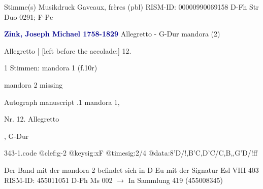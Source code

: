 \documentclass[twocolumn]{book}
\begin{document}
\newline \textcolor{darkblue}{}  Stimme(s)
\newline Musikdruck
\newline Gaveaux, frères  (pbl)
\newline RISM-ID: 00000990069158
\newline D-Fh  Str Duo 0291; F-Pc
\newline \par \vspace{7pt} \textcolor{darkblue}{\textbf{Zink, Joseph Michael  1758-1829}}
\newline Allegretto - G-Dur
\newline mandora (2)
\newline \begin{itshape}[f.10r, at left:] Allegretto | [left before the accolade:] 12.\end{itshape} 
\newline \textcolor{darkblue}{}  1 Stimmen: mandora 1  (f.10r)
\newline \begin{small} mandora 2 missing\end{small} 
\newline Autograph manuscript
.1  mandora 1, \begin{itshape}Nr. 12. Allegretto\end{itshape}, G-Dur  
\begin{filecontents*}{343-1.code}
@clef:g-2
@keysig:xF
@timesig:2/4
@data:8'D/!,B'C,D'C/C,B,,G'D/!ff
\end{filecontents*}
\newline
%
\newline Der Band mit der mandora 2 befindet sich in D Eu mit der Signatur Esl VIII 403
\newline RISM-ID: 455011051
\newline D-Fh  Ms 002
\newline $\rightarrow$ In Sammlung 419 (455008345)
      
\end{document}
